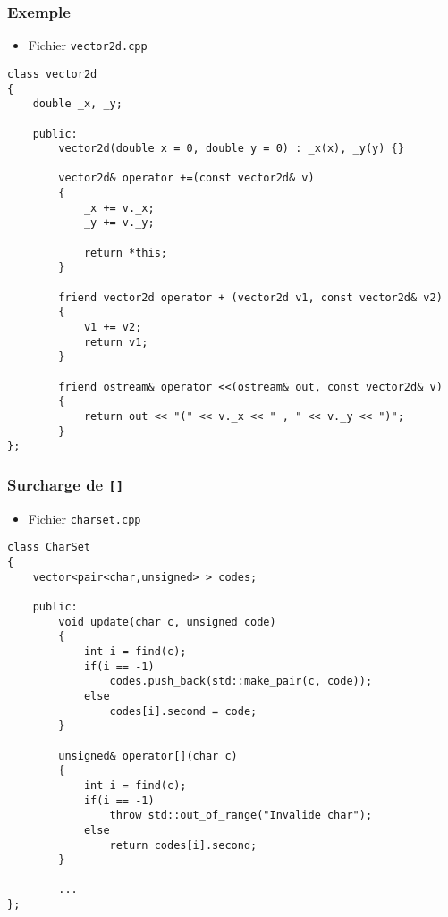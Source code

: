 \begin{frame}[containsverbatim]
\frametitle{Exemple}
\begin{itemize}
\item Fichier \texttt{vector2d.cpp}
\end{itemize}
\begin{lstlisting}
class vector2d
{
    double _x, _y;
    
    public:
        vector2d(double x = 0, double y = 0) : _x(x), _y(y) {}                            
    
        vector2d& operator +=(const vector2d& v)
        {
            _x += v._x;
            _y += v._y;
            
            return *this;
        }
    
        friend vector2d operator + (vector2d v1, const vector2d& v2)
        {
            v1 += v2;
            return v1;
        }
    
        friend ostream& operator <<(ostream& out, const vector2d& v)
        {
            return out << "(" << v._x << " , " << v._y << ")";
        }
};
\end{lstlisting}
\end{frame}

\begin{frame}[containsverbatim]
\frametitle{Surcharge de \lstinline|[]|}
\begin{itemize}
\item Fichier \texttt{charset.cpp}
\end{itemize}
\begin{lstlisting}
class CharSet
{
	vector<pair<char,unsigned> > codes;

	public:		
		void update(char c, unsigned code)
		{
			int i = find(c);
			if(i == -1)
				codes.push_back(std::make_pair(c, code));
			else
				codes[i].second = code;
		}

		unsigned& operator[](char c)
		{
			int i = find(c);
			if(i == -1)
				throw std::out_of_range("Invalide char");
			else
				return codes[i].second;
		}

		...
};
\end{lstlisting}
\end{frame}

